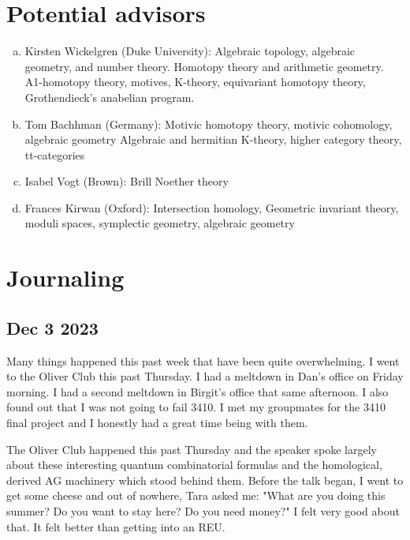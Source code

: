 \documentclass[12pt]{article}
\begin{document}
\section{Potential advisors}
\begin{enumerate}[(a)]
    \item Kirsten Wickelgren (Duke University): Algebraic topology, algebraic geometry, and number theory. Homotopy theory and arithmetic geometry. A1-homotopy theory, motives, K-theory, equivariant homotopy theory, Grothendieck’s anabelian program.
    \item Tom Bachhman (Germany): Motivic homotopy theory, motivic cohomology, algebraic geometry Algebraic and hermitian K-theory, higher category theory, tt-categories
    \item Isabel Vogt (Brown): Brill Noether theory
    \item Frances Kirwan (Oxford): Intersection homology, Geometric invariant theory, moduli spaces, symplectic geometry, algebraic geometry
\end{enumerate}

\section{Journaling}
\subsection{Dec 3 2023}
\doublespacing
Many things happened this past week that have been quite overwhelming. I went to the Oliver Club this past Thursday.
I had a meltdown in Dan's office on Friday morning. I had a second meltdown in Birgit's office that same afternoon.
I also found out that I was not going to fail 3410. I met my groupmates for the 3410 final project and I honestly had a great time being with them.

\hfill

The Oliver Club happened this past Thursday and the speaker spoke largely about these interesting quantum combinatorial formulas and the homological,
derived AG machinery which stood behind them. Before the talk began, I went to get some cheese and out of nowhere, Tara asked me: "What are you doing this summer? Do you want to stay here?
Do you need money?" I felt very good about that. It felt better than getting into an REU.

\hfill
\end{document}
